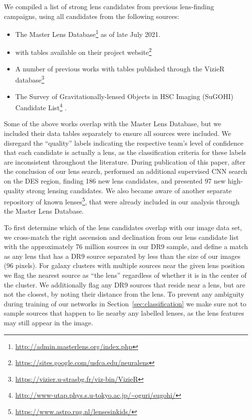 \documentclass{aastex631}
\begin{document}
We compiled a list of strong lens candidates from previous lens-finding campaigns, using all candidates from the following sources:
\begin{itemize}
    \item The Master Lens Database\footnote{\url{http://admin.masterlens.org/index.php}} as of late July 2021.
    \item \citet{HuangI, HuangII} with tables available on their project website\footnote{\url{https://sites.google.com/usfca.edu/neuralens}}
    \item A number of previous works with tables published through the VizieR database\footnote{\url{https://vizier.u-strasbg.fr/viz-bin/VizieR}} \citep{CanamerasI, JacobsI, JacobsII, JacobsIII, Diehl, Carrasco, Pourrahmani}
    \item The Survey of Gravitationally-lensed Objects in HSC Imaging (SuGOHI) Candidate List\footnote{\url{http://www-utap.phys.s.u-tokyo.ac.jp/~oguri/sugohi/}} \citep{SUGOHI_I,SUGOHI_II,SUGOHI_III,SUGOHI_IV,SUGOHI_V,SUGOHI_VI}. 
\end{itemize}
Some of the above works overlap with the Master Lens Database, but we included their data tables separately to ensure all sources were included. We disregard the ``quality'' labels indicating the respective team's level of confidence that each candidate is actually a lens, as the classification criteria for these labels are inconsistent throughout the literature. During publication of this paper, after the conclusion of our lens search, \citet{rojas2021strong} performed an additional supervised CNN search on the DES region, finding 186 new lens candidates, and \citet{LIII} presented 97 new high-quality strong lensing candidates. We also became aware of another separate repository of known lenses\footnote{\url{https://www.astro.rug.nl/lensesinkids/}}, that were already included in our analysis through the Master Lens Database.  

To first determine which of the lens candidates overlap with our image data set, we cross-match the right ascension and declination from our lens candidate list with the approximately 76 million sources in our DR9 sample, and define a match as any lens that has a DR9 source separated by less than the size of our images (96 pixels). For galaxy clusters with multiple sources near the given lens position we flag the nearest source as ``the lens'' regardless of whether it is in the center of the cluster. We additionally flag any DR9 sources that reside near a lens, but are not the closest, by noting their distance from the lens. To prevent any ambiguity during training of our networks in Section~\ref{sec:classification} we make sure not to sample sources that happen to lie nearby any labelled lenses, as the lens features may still appear in the image.
\end{document}
